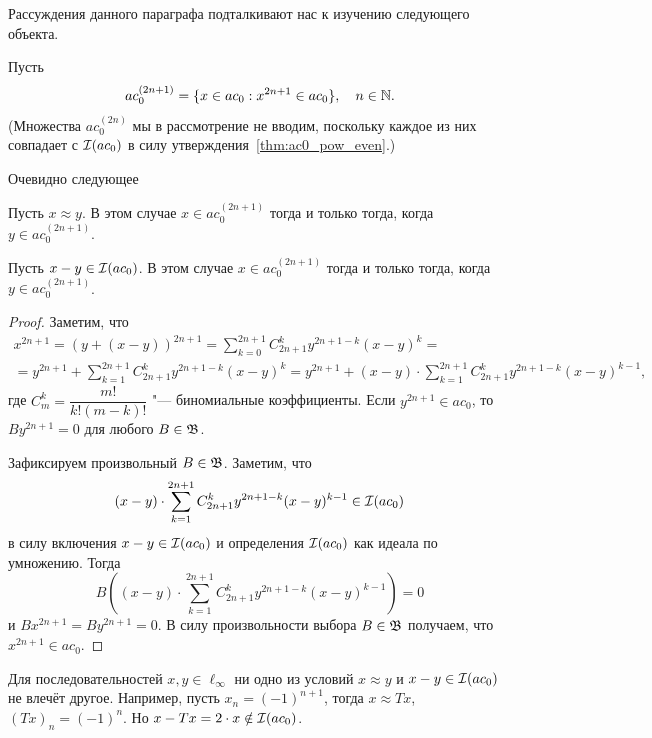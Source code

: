 Рассуждения данного параграфа подталкивают нас к изучению следующего объекта.

Пусть
\begin{equation}
	ac_0^{(2n+1)} = \{ x\in ac_0 : x^{2n+1} \in ac_0\}, \quad n\in\mathbb{N}
	.
\end{equation}
(Множества $ac_0^{(2n)}$ мы в рассмотрение не вводим, поскольку каждое из них совпадает с $\mathcal{I}(ac_0)$ в силу утверждения~\ref{thm:ac0_pow_even}.)

Очевидно следующее
\begin{proposition}
	Пусть $x \approx y$.
	В этом случае $x \in ac_0^{(2n+1)}$ тогда и только тогда, когда $y \in ac_0^{(2n+1)}$.
\end{proposition}

\begin{proposition}
	Пусть $x - y \in \mathcal{I}(ac_0)$.
	В этом случае $x \in ac_0^{(2n+1)}$ тогда и только тогда, когда $y \in ac_0^{(2n+1)}$.
\end{proposition}

\begin{proof}
	Заметим, что
	\begin{multline}
		x^{2n+1} =
		(y + (x-y))^{2n+1} =
		\sum_{k=0}^{2n+1} C_{2n+1}^k y^{2n+1-k} (x-y)^{k} =
		\\=
		y^{2n+1} + \sum_{k=1}^{2n+1} C_{2n+1}^k y^{2n+1-k} (x-y)^{k} =
		y^{2n+1} + (x-y) \cdot \sum_{k=1}^{2n+1} C_{2n+1}^k y^{2n+1-k} (x-y)^{k-1}
		,
	\end{multline}
	где $C_{m}^k = \dfrac{m!}{k!(m-k)!}$ "--- биномиальные коэффициенты.
	Если $y^{2n+1} \in ac_0$, то $B y^{2n+1} =0 $ для любого $B\in \mathfrak{B}$.

	Зафиксируем произвольный $B \in \mathfrak{B}$.
	Заметим, что
	\begin{equation}
		(x-y) \cdot \sum_{k=1}^{2n+1} C_{2n+1}^k y^{2n+1-k} (x-y)^{k-1} \in \mathcal{I}(ac_0)
	\end{equation}
	в силу включения $x-y\in\mathcal{I}(ac_0)$ и определения $\mathcal{I}(ac_0)$ как идеала по умножению.
	Тогда
	\begin{equation}
		B\left((x-y) \cdot \sum_{k=1}^{2n+1} C_{2n+1}^k y^{2n+1-k} (x-y)^{k-1}\right) = 0
	\end{equation}
	и $B x^{2n+1} = B y^{2n+1} =0$.
	В силу произвольности выбора $B \in \mathfrak{B}$ получаем, что $x^{2n+1} \in ac_0$.
\end{proof}


	Для последовательностей $x,y \in \ell_\infty$ ни одно из условий $x\approx y$ и $x-y\in\mathcal{I}(ac_0)$
	не влечёт другое.
	Например, пусть $x_n = (-1)^{n+1}$, тогда $x \approx Tx$, $(Tx)_n = (-1)^{n}$.
	Но $x-Tx = 2 \cdot x \notin \mathcal{I}(ac_0)$.

